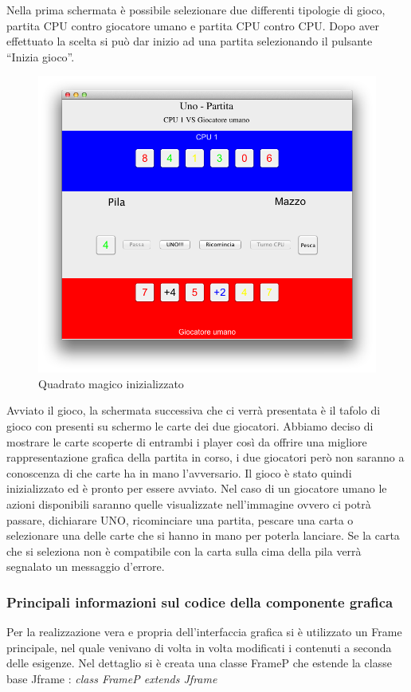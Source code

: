 		Nella prima schermata è possibile selezionare due differenti tipologie di gioco, partita CPU contro giocatore umano e partita CPU contro CPU. Dopo aver effettuato la scelta si può dar inizio ad una partita selezionando il pulsante “Inizia gioco”. 
		
		\begin{figure}[h]
			\centering
			\includegraphics[scale=0.6]{2.png}
			\caption{Quadrato magico inizializzato}
			\label{fig2}
		\end{figure}
		
		Avviato il gioco, la schermata successiva che ci verrà presentata è il tafolo di gioco con presenti su schermo le carte dei due giocatori. Abbiamo deciso di mostrare le carte scoperte di entrambi i player così da offrire una migliore rappresentazione grafica della partita in corso, i due giocatori però non saranno a conoscenza di che carte ha in mano l’avversario. Il gioco è stato quindi inizializzato ed è pronto per essere avviato. Nel caso di un giocatore umano le azioni disponibili saranno quelle visualizzate nell’immagine ovvero ci potrà passare, dichiarare UNO, ricominciare una partita, pescare una carta o selezionare una delle carte che si hanno in mano per poterla lanciare. Se la carta che si seleziona non è compatibile con la carta sulla cima della pila verrà segnalato un messaggio d’errore.
		
		\subsubsection{Principali informazioni sul codice della componente grafica}
			Per la realizzazione vera e propria dell'interfaccia grafica si è utilizzato un Frame principale, nel quale venivano di volta in volta modificati i contenuti a seconda delle esigenze. Nel dettaglio si è creata una classe FrameP che estende la classe base Jframe : \textit{class FrameP extends Jframe}\\\\
			
